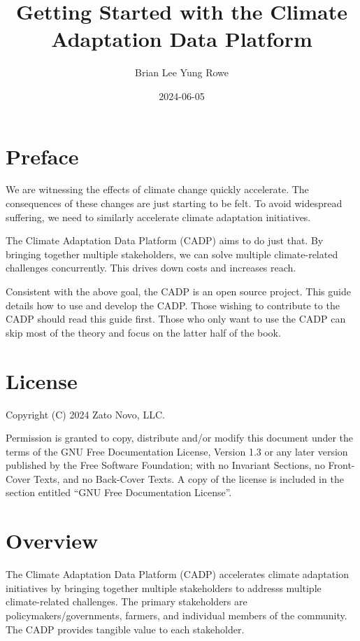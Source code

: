 \documentclass[
]{book}
\title{Getting Started with the Climate Adaptation Data Platform}
\author{Brian Lee Yung Rowe}
\date{2024-06-05}
\begin{document}
\maketitle

{
\setcounter{tocdepth}{1}
\tableofcontents
}
\hypertarget{preface}{%
\chapter{Preface}\label{preface}}

We are witnessing the effects of climate change quickly accelerate.
The consequences of these changes are just starting to be felt.
To avoid widespread suffering, we need to similarly accelerate climate
adaptation initiatives.

The Climate Adaptation Data Platform (CADP) aims to do just that.
By bringing together multiple stakeholders,
we can solve multiple climate-related challenges concurrently.
This drives down costs and increases reach.

Consistent with the above goal, the CADP is an open source project.
This guide details how to use and develop the CADP.
Those wishing to contribute to the CADP should read this guide first.
Those who only want to use the CADP can skip most of the theory and focus
on the latter half of the book.

\hypertarget{license}{%
\chapter{License}\label{license}}

Copyright (C) 2024 Zato Novo, LLC.

Permission is granted to copy, distribute and/or modify this document
under the terms of the GNU Free Documentation License, Version 1.3
or any later version published by the Free Software Foundation;
with no Invariant Sections, no Front-Cover Texts, and no Back-Cover Texts.
A copy of the license is included in the section entitled ``GNU
Free Documentation License''.

\hypertarget{overview}{%
\chapter{Overview}\label{overview}}

The Climate Adaptation Data Platform (CADP) accelerates climate adaptation
initiatives by bringing together multiple stakeholders to addresss
multiple climate-related challenges.
The primary stakeholders are policymakers/governments, farmers,
and individual members of the community.
The CADP provides tangible value to each stakeholder.
\end{document}
